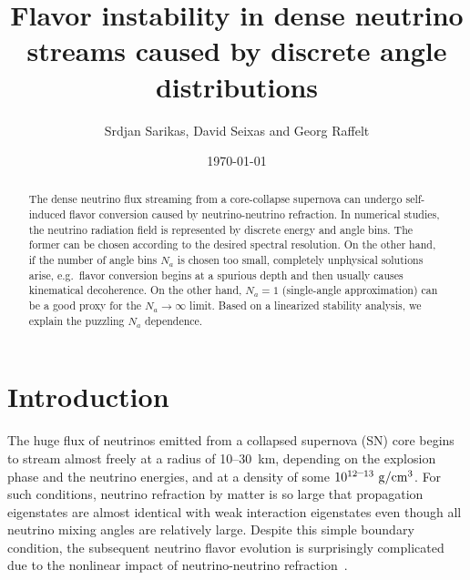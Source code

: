 \documentclass[twocolumn,prd,showpacs,
floatfix,preprintnumbers,nofootinbib]{revtex4}
\begin{document}
\title{Flavor instability in dense neutrino streams caused by
discrete angle distributions}

\author{Srdjan Sarikas, David Seixas and Georg Raffelt}

\date{\today}


\begin{abstract}
The dense neutrino flux streaming from a core-collapse supernova can
undergo self-induced flavor conversion caused by neutrino-neutrino
refraction. In numerical studies, the neutrino radiation field is
represented by discrete energy and angle bins. The former can be
chosen according to the desired spectral resolution. On the other
hand, if the number of angle bins $N_a$ is chosen too small,
completely unphysical solutions arise, e.g.\ flavor conversion
begins at a spurious depth and then usually causes kinematical
decoherence. On the other hand, $N_a=1$ (single-angle approximation)
can be a good proxy for the $N_a\to\infty$ limit. Based on a
linearized stability analysis, we explain the puzzling $N_a$
dependence.
\end{abstract}




\maketitle


\section{Introduction}
\label{sec:intro}

The huge flux of neutrinos emitted from a collapsed supernova (SN)
core begins to stream almost freely at a radius of 10--30~km,
depending on the explosion phase and the neutrino energies, and at a
density of some $10^{12\hbox{--}13}~{\rm g}/{\rm cm}^3$. For such
conditions, neutrino refraction by matter is so large that
propagation eigenstates are almost identical with weak interaction
eigenstates even though all neutrino mixing angles are relatively large.
Despite this simple boundary condition, the subsequent neutrino
flavor evolution is surprisingly complicated due to the nonlinear
impact of neutrino-neutrino refraction~\cite{Duan:2006an,
Duan:2010bg}.
\end{document}
